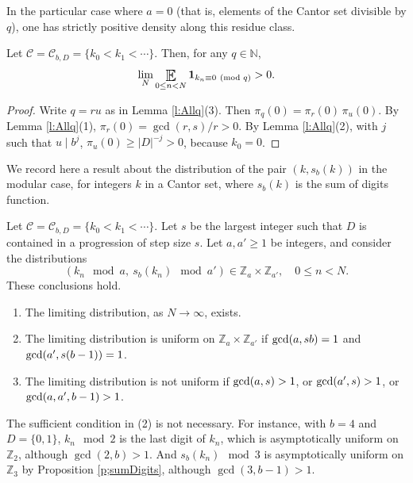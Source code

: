 In the particular case where $a=0$ (that is, elements of the Cantor set divisible by $q$), one has strictly positive density along this residue class.

\begin{lemma}\label{lem:positiveDensity}
    Let $\mathcal{C}=\mathcal C_{b,D}=\{k_0<k_1<\cdots\}$. Then, for any $q\in \mathbb{N}$, \begin{align*}
        \lim_N \Expectation_{0\leq n<N}\mathbf{1}_{k_n\equiv 0\ (\text{mod }q)}>0.
    \end{align*}
\end{lemma}

\begin{proof}
Write $q=ru$ as in Lemma \ref{l:Allq}(3). Then $\pi_q(0)=\pi_r(0)\,\pi_u(0)$. 
By Lemma \ref{l:Allq}(1), $\pi_r(0)=\gcd(r,s)/r>0$. 
By Lemma \ref{l:Allq}(2), with $j$ such that $u\mid b^j$, $\pi_u(0)\geq \lvert D\rvert^{-j}>0$, because $k_0=0$. 
\end{proof}


We record here a result about the  distribution of 
the pair $(k, s_b(k))$ in the modular case, for integers $k$ in a Cantor set, where $s_b(k)$ is the sum of digits function. 

\begin{theorem}\label{t:modularJoint}
Let $\mathcal{C} = \mathcal{C}_{b,D}=\{k_0<k_1<\cdots \}$. Let $s$ be the largest integer such that $D$ is contained in a progression of step size $s$.  Let $a,a'\geq 1$ be integers, and consider the distributions 
\begin{equation}
    (k_n \mod a,\ s_b(k_n)\mod a')\in\mathbb{Z}_a\times\mathbb{Z}_{a'}, \quad 0\leq n< N. 
\end{equation}
These conclusions hold. 
\begin{enumerate}
    \item  The limiting distribution, as $N\to\infty$, exists. 

    \item The limiting distribution is uniform on $\mathbb{Z}_a\times\mathbb{Z}_{a'}$ if 
    $\textup{gcd}(a,sb)=1$ and  $\textup{gcd}(a',s(b-1))=1$. 

    \item The limiting distribution is not uniform if $\textup{gcd}(a,s)>1$, or $\textup{gcd}(a',s)>1$, or $\textup{gcd}(a,a',b-1)>1$. 
\end{enumerate}
\end{theorem}

The sufficient condition in (2) is not necessary. 
For instance, with $b=4$ and $D=\{0,1\}$, $k_n\mod 2$ is the last digit of $k_n$, which is asymptotically uniform on $\mathbb{Z}_2$, although $\gcd(2,b)>1$. 
And $s_b(k_n)\mod 3$ is asymptotically uniform on $\mathbb{Z}_3$ by Proposition \ref{p;sumDigits}, although $\gcd(3,b-1)>1$. 

